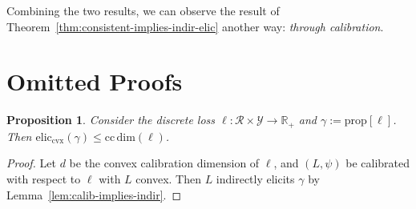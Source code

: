 \documentclass{article}
\newcommand{\reals}{\mathbb{R}}
\newcommand{\prop}[1]{\mathrm{prop}[#1]}
\newcommand{\eliccvx}{\mathrm{elic}_\mathrm{cvx}}
\newcommand{\ccdim}{\mathrm{cc\,dim}}
\newcommand{\R}{\mathcal{R}}
\newcommand{\Y}{\mathcal{Y}}
\newtheorem{proposition}{Proposition}
\begin{document}
Combining the two results, we can observe the result of Theorem~\ref{thm:consistent-implies-indir-elic} another way: \emph{through calibration}.

\section{Omitted Proofs}\label{app:omitted-proofs}
\begin{proposition}\label{prop:elic-cplx-lb-ccdim}
	Consider the discrete loss $\ell : \R \times \Y \to \reals_+$ and $\gamma:= \prop{\ell}$.
	Then $\eliccvx(\gamma) \leq \ccdim(\ell)$.
\end{proposition}
\begin{proof}
	Let $d$ be the convex calibration dimension of $\ell$, and $(L, \psi)$ be calibrated with respect to $\ell$ with $L$ convex.
	Then $L$ indirectly elicits $\gamma$ by Lemma~\ref{lem:calib-implies-indir}.
\end{proof}
\end{document}
